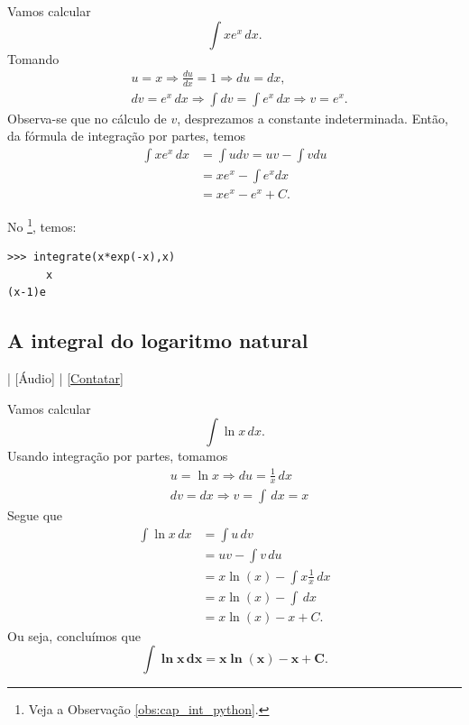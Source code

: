 \begin{ex}
  Vamos calcular
  \begin{equation}
    \int xe^x\,dx.
  \end{equation}
  Tomando
  \begin{align}
    &u = x \Rightarrow \frac{du}{dx} = 1 \Rightarrow du = dx,\\
    &dv = e^x\,dx \Rightarrow \int dv = \int e^x\,dx \Rightarrow v = e^x.
  \end{align}
  Observa-se que no cálculo de $v$, desprezamos a constante indeterminada. Então, da fórmula de integração por partes, temos
  \begin{align}
    \int xe^x\,dx &= \int udv = uv - \int vdu \\
                  &= xe^x - \int e^xdx \\
                  &= xe^x - e^x + C.
  \end{align}
  
  \ifispython
  No \sympy\footnote{Veja a Observação \ref{obs:cap_int_python}.}, temos:
\begin{verbatim}
>>> integrate(x*exp(-x),x)
      x
(x-1)e
\end{verbatim}
  \fi
\end{ex}

\subsection{A integral do logaritmo natural}

\begin{flushright}
  [Vídeo] | [Áudio] | \href{https://phkonzen.github.io/notas/contato.html}{[Contatar]}
\end{flushright}

Vamos calcular
\begin{equation}
  \int \ln x\,dx.
\end{equation}
Usando integração por partes, tomamos
\begin{align}
  &u = \ln x \Rightarrow du = \frac{1}{x}\,dx \\
  &dv = dx \Rightarrow v = \int\,dx = x
\end{align}
Segue que
\begin{align}
  \int \ln x \,dx &= \int u\,dv \\
                  &= uv - \int v\,du \\
                  &= x\ln(x) - \int x\frac{1}{x}\,dx \\
                  &= x\ln(x) - \int\,dx \\
                  &= x\ln(x) - x + C.
\end{align}
Ou seja, concluímos que
\begin{equation}\label{eq:int_lnx}
  \pmb{\int \ln x \,dx = x\ln(x) - x + C}.
\end{equation}

